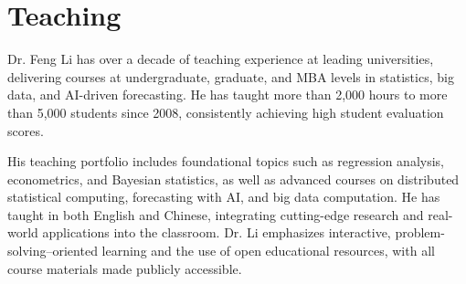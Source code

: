 \documentclass[twoside,a4paper]{article}
\begin{document}
\newpage
\section{Teaching}

Dr. Feng Li has over a decade of teaching experience at leading universities, delivering courses at undergraduate, graduate, and MBA levels in statistics, big data, and AI-driven forecasting. He has taught more than 2,000 hours to more than 5,000 students since 2008, consistently achieving high student evaluation scores.

His teaching portfolio includes foundational topics such as regression analysis, econometrics, and Bayesian statistics, as well as advanced courses on distributed statistical computing, forecasting with AI, and big data computation. He has taught in both English and Chinese, integrating cutting-edge research and real-world applications into the classroom. Dr. Li emphasizes interactive, problem-solving–oriented learning and the use of open educational resources, with all course materials made publicly accessible.
\end{document}
